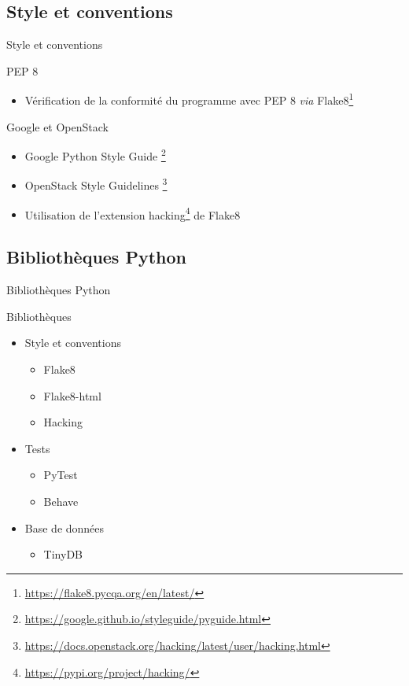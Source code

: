 \subsection{Style et conventions}
\begin{frame}{Style et conventions}
  \begin{block}{PEP 8}
    \begin{itemize}
    \item Vérification de la conformité du programme avec PEP 8
      \textit{via}
      Flake8\footnote{\url{https://flake8.pycqa.org/en/latest/}}
    \end{itemize}
  \end{block}
  
  \begin{block}{Google et OpenStack}
    \begin{itemize}
    \item Google Python Style Guide \footnote{\url{https://google.github.io/styleguide/pyguide.html}}
    \item OpenStack Style
      Guidelines \footnote{\url{https://docs.openstack.org/hacking/latest/user/hacking.html}}
    \item Utilisation de l'extension
      hacking\footnote{\url{https://pypi.org/project/hacking/}} de
      Flake8
    \end{itemize}
  \end{block}
\end{frame}

\subsection{Bibliothèques Python}
\begin{frame}{Bibliothèques Python}
  \begin{block}{Bibliothèques}
    \begin{itemize}
    \item Style et conventions
      \begin{itemize}
      \item Flake8
      \item Flake8-html
      \item Hacking      
      \end{itemize}

    \item Tests
      \begin{itemize}
      \item PyTest
      \item Behave
      \end{itemize}

    \item Base de données
      \begin{itemize}
      \item TinyDB
      \end{itemize}
    \end{itemize}
  \end{block}
\end{frame}
